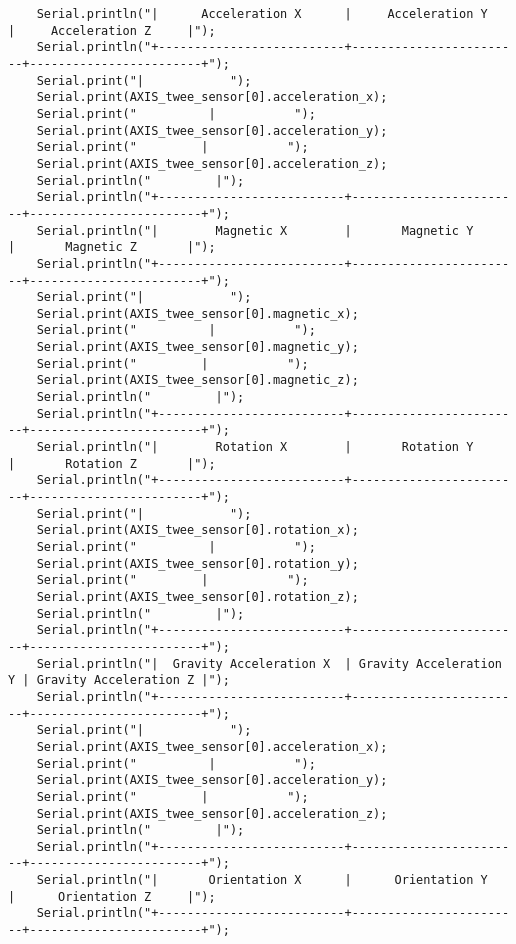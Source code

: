 \begin{lstlisting}
    Serial.println("|      Acceleration X      |     Acceleration Y     |     Acceleration Z     |");
    Serial.println("+--------------------------+------------------------+------------------------+");
    Serial.print("|            ");
    Serial.print(AXIS_twee_sensor[0].acceleration_x);
    Serial.print("          |           ");
    Serial.print(AXIS_twee_sensor[0].acceleration_y);
    Serial.print("         |           ");
    Serial.print(AXIS_twee_sensor[0].acceleration_z);
    Serial.println("         |");
    Serial.println("+--------------------------+------------------------+------------------------+");
    Serial.println("|        Magnetic X        |       Magnetic Y       |       Magnetic Z       |");
    Serial.println("+--------------------------+------------------------+------------------------+");
    Serial.print("|            ");
    Serial.print(AXIS_twee_sensor[0].magnetic_x);
    Serial.print("          |           ");
    Serial.print(AXIS_twee_sensor[0].magnetic_y);
    Serial.print("         |           ");
    Serial.print(AXIS_twee_sensor[0].magnetic_z);
    Serial.println("         |");
    Serial.println("+--------------------------+------------------------+------------------------+");
    Serial.println("|        Rotation X        |       Rotation Y       |       Rotation Z       |");
    Serial.println("+--------------------------+------------------------+------------------------+");
    Serial.print("|            ");
    Serial.print(AXIS_twee_sensor[0].rotation_x);
    Serial.print("          |           ");
    Serial.print(AXIS_twee_sensor[0].rotation_y);
    Serial.print("         |           ");
    Serial.print(AXIS_twee_sensor[0].rotation_z);
    Serial.println("         |");
    Serial.println("+--------------------------+------------------------+------------------------+");
    Serial.println("|  Gravity Acceleration X  | Gravity Acceleration Y | Gravity Acceleration Z |");
    Serial.println("+--------------------------+------------------------+------------------------+");
    Serial.print("|            ");
    Serial.print(AXIS_twee_sensor[0].acceleration_x);
    Serial.print("          |           ");
    Serial.print(AXIS_twee_sensor[0].acceleration_y);
    Serial.print("         |           ");
    Serial.print(AXIS_twee_sensor[0].acceleration_z);
    Serial.println("         |");
    Serial.println("+--------------------------+------------------------+------------------------+");
    Serial.println("|       Orientation X      |      Orientation Y     |      Orientation Z     |");
    Serial.println("+--------------------------+------------------------+------------------------+");

\end{lstlisting}
